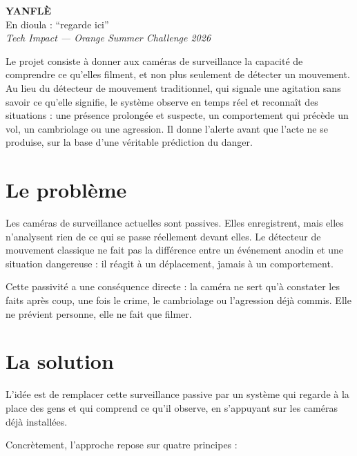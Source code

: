 \documentclass[11pt,a4paper]{article}
\begin{document}
\begin{center}
  {\Huge\bfseries YANFLÈ}\\[6pt]
  {\large En dioula : ``regarde ici''}\\[4pt]
  {\itshape Tech Impact --- Orange Summer Challenge 2026}
\end{center}

\vspace{1.5em}

Le projet consiste à donner aux caméras de surveillance la capacité de comprendre ce qu'elles filment, et non plus seulement de détecter un mouvement. Au lieu du détecteur de mouvement traditionnel, qui signale une agitation sans savoir ce qu'elle signifie, le système observe en temps réel et reconnaît des situations : une présence prolongée et suspecte, un comportement qui précède un vol, un cambriolage ou une agression. Il donne l'alerte avant que l'acte ne se produise, sur la base d'une véritable prédiction du danger.

\section{Le problème}
Les caméras de surveillance actuelles sont passives. Elles enregistrent, mais elles n'analysent rien de ce qui se passe réellement devant elles. Le détecteur de mouvement classique ne fait pas la différence entre un événement anodin et une situation dangereuse : il réagit à un déplacement, jamais à un comportement.

Cette passivité a une conséquence directe : la caméra ne sert qu'à constater les faits après coup, une fois le crime, le cambriolage ou l'agression déjà commis. Elle ne prévient personne, elle ne fait que filmer.

\section{La solution}
L'idée est de remplacer cette surveillance passive par un système qui regarde à la place des gens et qui comprend ce qu'il observe, en s'appuyant sur les caméras déjà installées.

Concrètement, l'approche repose sur quatre principes :
\end{document}
